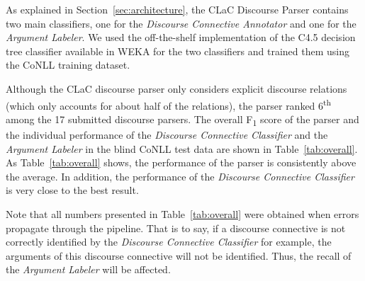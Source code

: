 \documentclass[11pt]{article}
\begin{document}
As explained in Section~\ref{sec:architecture}, the CLaC Discourse Parser contains two main classifiers, one for the \textit{Discourse Connective Annotator} and one for the \textit{Argument Labeler}. We used the off-the-shelf implementation of the C4.5 decision tree classifier \cite{quinlan93} available in WEKA \cite{hall09} for the two classifiers and trained them using the CoNLL training dataset.

Although the CLaC discourse parser only considers explicit discourse relations (which only accounts for about half of the relations), the parser ranked 6\textsuperscript{th} among the 17 submitted discourse parsers. The overall F\textsubscript{1} score of the parser and the individual performance of the \textit{Discourse Connective Classifier} and the \textit{Argument Labeler} in the blind CoNLL test data are shown in Table~\ref{tab:overall}. As Table~\ref{tab:overall} shows, the performance of the parser is consistently above the average. In addition, the performance of the \textit{Discourse Connective Classifier} is very close to the best result. 

Note that all numbers presented in Table~\ref{tab:overall} were obtained when errors propagate through the pipeline. That is to say, if a discourse connective is not correctly identified by the \textit{Discourse Connective Classifier} for example, the arguments of this discourse connective will not  be identified. Thus, the recall of the \textit{Argument Labeler} will be affected. 


\end{document}
